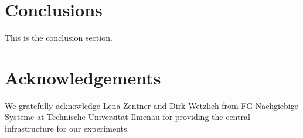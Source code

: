 \documentclass[a4paper,12pt]{article}
\begin{document}





\section{Conclusions}
This is the conclusion section.

\section{Acknowledgements}
We gratefully acknowledge Lena Zentner and Dirk Wetzlich from FG Nachgiebige Systeme at Technische Universität Ilmenau for providing the central infrastructure for our experiments.



 

\end{document}
